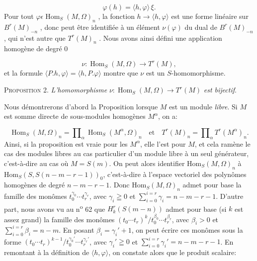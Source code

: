 \begin{equation*}
\varphi(h) = \langle h, \varphi \rangle \, \xi .
\end{equation*}
Pour tout $\varphi \epsilon \operatorname{Hom}_S(M, \Omega)_n$ , la fonction $h \to \langle h, \varphi \rangle$ est une forme linéaire sur $B^r(M)_{-n}$ , donc peut être identifiée à un élément $\nu(\varphi)$ du dual de $B^r(M)_{-n}$ , qui n'est autre que $T^r(M)_n$ . Nous avons ainsi défini une application homogène de degré 0

\begin{equation*}
\nu : \operatorname{Hom}_S(M, \Omega) \to T^r(M),
\end{equation*}
et la formule $\langle P.h, \varphi \rangle = \langle h, P.\varphi \rangle$ montre que $\nu$ est un $S$-homomorphisme.

\textsc{Proposition} 2. \textit{L'homomorphisme} $\nu : \operatorname{Hom}_S(M, \Omega) \to T^r(M)$ \textit{est bijectif}.

Nous démontrerons d'abord la Proposition lorsque $M$ est un module \textit{libre}. Si $M$ est somme directe de sous-modules homogènes $M^\alpha$, on a:

\begin{equation*}
\operatorname{Hom}_S(M, \Omega)_n = \prod\nolimits_\alpha \operatorname{Hom}_S(M^\alpha, \Omega)_n \quad \text{et} \quad T^r(M)_n = \prod\nolimits_\alpha T^r(M^\alpha)_n .
\end{equation*}
Ainsi, si la proposition est vraie pour les $M^\alpha$, elle l'est pour $M$, et cela ramène le cas des modules libres au cas particulier d'un module libre à un seul générateur,
c'est-à-dire au cas où $M = S(m)$. On peut alors identifier $\mathrm{Hom}_S(M, \Omega)_n$ à $\mathrm{Hom}_S(S, S(n - m - r - 1))_0$, c'est-à-dire à l'espace vectoriel des polynômes homogènes de degré $n - m - r - 1$. Donc $\mathrm{Hom}_S(M, \Omega)_n$ admet pour base la famille des monômes $t_0^{\gamma_0} \cdots t_r^{\gamma_r}$, avec $\gamma_i \geqq 0$ et $\sum_{i=0}^{i=r} \gamma_i = n - m - r - 1$. D'autre part, nous avons vu au n\textsuperscript{o} 62 que $H_k^r(S(m - n))$ admet pour base (si $k$ est assez grand) la famille des monômes $(t_0 \cdots t_r)^k/t_0^{\beta_0} \cdots t_r^{\beta_r}$, avec $\beta_i > 0$ et $\sum_{i=0}^{i=r} \beta_i = n - m$. En posant $\beta_i = \gamma_i' + 1$, on peut écrire ces monômes sous la forme $(t_0 \cdots t_r)^{k-1}/t_0^{\gamma_0'} \cdots t_r^{\gamma_r'}$, avec $\gamma_i' \geqq 0$ et $\sum_{i=0}^{i=r} \gamma_i' = n - m - r - 1$. En remontant à la définition de $\langle h, \varphi \rangle$, on constate alors que le produit scalaire:

